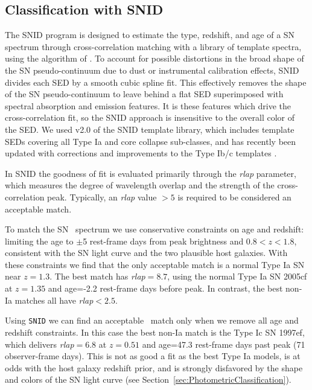 \subsection{Classification with SNID}
\label{sec:SNID}

The SNID program is designed to estimate the type, redshift, and age
of a SN spectrum through cross-correlation matching with a library of
template spectra, using the algorithm of \citet{Tonry:1979}.
To account for possible distortions in the broad shape of the SN
pseudo-continuum due to dust or instrumental calibration effects, SNID
divides each SED by a smooth cubic spline fit. This effectively
removes the shape of the SN pseudo-continuum to leave behind a flat
SED superimposed with spectral absorption and emission features.  It
is these features which drive the cross-correlation fit, so the SNID
approach is insensitive to the overall color of the SED.  We used v2.0
of the SNID template library, which includes template SEDs covering
all Type Ia and core collapse sub-classes, and has recently been
updated with corrections and improvements to the Type Ib/c
templates \citep{Liu:2014}.

In SNID the goodness of fit is evaluated primarily through the {\it
rlap} parameter, which measures the degree of wavelength overlap and
the strength of the cross-correlation peak.  Typically, an {\it rlap}
value $>5$ is required to be considered an acceptable match.  

To match the SN \tomas\ spectrum we use conservative constraints on
age and redshift: limiting the age to $\pm$5 rest-frame days from peak
brightness and $0.8<z<1.8$, consistent with the SN light curve and
the two plausible host galaxies.  With these constraints we find that the only
acceptable match is a normal Type Ia SN near $z=1.3$. The best match
has {\it rlap}$=8.7$, using the normal Type Ia SN 2005cf at $z=1.35$
and age=-2.2 rest-frame days before peak.  In contrast, 
the best non-Ia matches all have {\it rlap}$<2.5$.

Using {\tt SNID} we can find an acceptable \CCSN\ match only when we
remove all age and redshift constraints. In this case the best non-Ia
match is the Type Ic SN 1997ef, which delivers {\it rlap}$=6.8$ at
$z=0.51$ and age=47.3 rest-frame days past peak (71 observer-frame
days).  This is not as good a fit as the best Type Ia models, is at
odds with the host galaxy redshift prior, and is strongly disfavored
by the shape and colors of the SN light curve (see
Section~\ref{sec:PhotometricClassification}).

